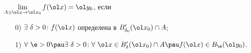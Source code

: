 
	 $\lim\limits_{A\ni\ol x\to \ol x_0}f(\ol x) = \ol y_0$, если
	 \begin{itemize}
	   \item [0)] $\exists\ \delta > 0\colon f(\ol x)$ определена в $B'_{\delta_0}(\ol x_0)\cap A$;
	   \item [1)] $\forall\ \e>0\pau \exists\ \delta >0 \colon \forall\ \ol x\in B'_\delta(\ol x_0)\cap A\pau f(\ol x)\in B_\e(\ol y_0)$.
	 \end{itemize}
	 